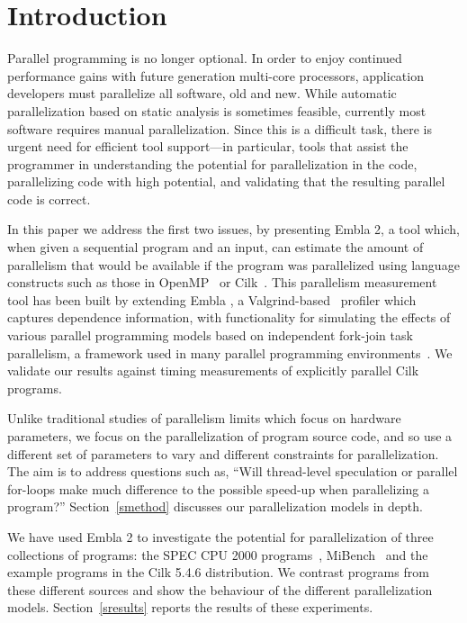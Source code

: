\section{Introduction}

Parallel programming is no longer optional.  In order to enjoy continued
performance gains with future generation multi-core processors,
application developers must parallelize all software, old and
new.
While automatic parallelization based on static analysis 
is sometimes feasible, currently most software requires manual
parallelization.
Since this is a difficult task, there is urgent need for efficient tool support---in
particular, tools that assist the programmer in understanding the potential 
for parallelization in the code, parallelizing code with high potential, 
and validating that the resulting parallel code is correct.

In this paper we address the first two issues, by presenting Embla 2, a tool
which, when given a sequential program and an input, can estimate the 
amount of parallelism that would be available if the program was parallelized
using language constructs such as those in OpenMP~\cite{dagum98openmp}
or Cilk~\cite{blumofe96cilk}.
This parallelism measurement tool has been built by extending
Embla \cite{embla:08}, a Valgrind-based~\cite{valgrind:07} profiler which captures dependence information,
with functionality for simulating the effects of various parallel 
programming models based on independent fork-join task parallelism,
a framework used in many parallel programming
environments~\cite{blumofe96cilk,lea00java,reinders07intel,leijen07parallel}.
We validate our results against timing 
measurements of explicitly parallel Cilk programs.

Unlike traditional studies of parallelism limits \cite{wall91limits,warg01limits}
which focus on hardware parameters, we focus on the 
parallelization of program source code, and so use a
different set of parameters to vary and different constraints for
parallelization. The aim is to address questions such as,
``Will thread-level speculation or parallel for-loops make much
difference to the possible speed-up when parallelizing
a program?'' Section~\ref{smethod} 
discusses our parallelization models in depth.

We have used Embla 2 to investigate the potential for 
parallelization of three collections of programs: the SPEC CPU 2000 
programs~\cite{henning00spec}, MiBench~\cite{guthaus01mibench} and the example programs in
the Cilk 5.4.6 distribution.
We contrast programs from these different sources and show the behaviour of 
the different parallelization models.
Section~\ref{sresults} reports the results of these experiments.

